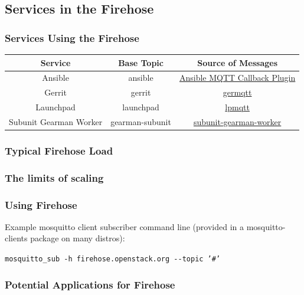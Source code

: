\documentclass[aspectratio=169,11pt,hyperref={colorlinks=true}]{beamer}
\begin{document}
\subsection{Services in the Firehose}
\begin{frame}
    \frametitle{Services Using the Firehose}
    \begin{center}
        \begin{tabular}{ccc}
            \hline
            \textbf{Service} & \textbf{Base Topic} & \textbf{Source of Messages}\\
            \hline
            Ansible & ansible & \href{http://git.openstack.org/cgit/openstack-infra/system-config/tree/modules/openstack_project/files/puppetmaster/mqtt.py}{Ansible MQTT Callback Plugin} \\
            Gerrit & gerrit & \href{http://git.openstack.org/cgit/openstack-infra/germqtt/}{germqtt} \\
            Launchpad & launchpad & \href{http://git.openstack.org/cgit/openstack-infra/lpmqtt/}{lpmqtt} \\
            Subunit Gearman Worker & gearman-subunit & \href{http://git.openstack.org/cgit/openstack-infra/puppet-subunit2sql/tree/files/subunit-gearman-worker.py}{subunit-gearman-worker} \\
        \end{tabular}
    \end{center}
\end{frame}

\begin{frame}
    \frametitle{Typical Firehose Load}
\end{frame}

\begin{frame}
    \frametitle{The limits of scaling}
\end{frame}

\begin{frame}
    \frametitle{Using Firehose}
    Example mosquitto client subscriber command line (provided in a
mosquitto-clients package on many distros):

    \begin{center}
        \texttt{mosquitto\_sub \--h firehose.openstack.org \--\--topic '\#'}
    \end{center}
\end{frame}


\begin{frame}
    \frametitle{Potential Applications for Firehose}
\end{frame}
\end{document}
